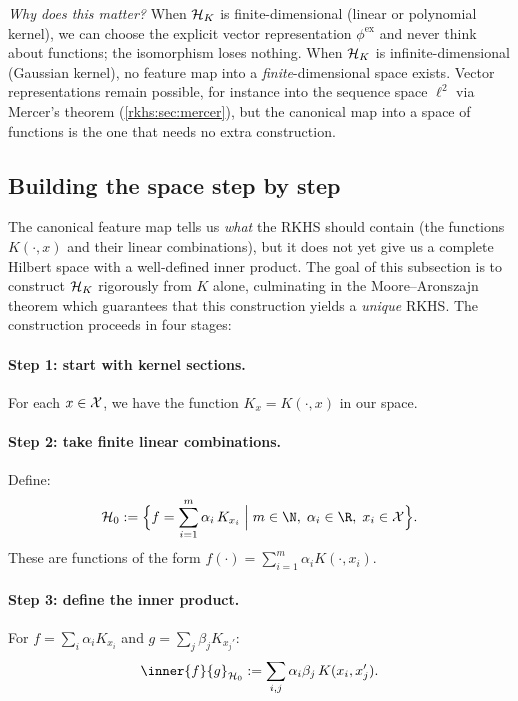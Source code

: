 \begin{notechapter}
\begin{intuition}
\emph{Why does this matter?} When $\mathcal{H}_K$ is
finite-dimensional (linear or polynomial kernel), we
can choose the explicit vector representation
$\phi^{\mathrm{ex}}$ and never think about functions;
the isomorphism loses nothing. When $\mathcal{H}_K$ is
infinite-dimensional (Gaussian kernel), no feature map into a \emph{finite}-dimensional space exists. Vector representations remain possible, for instance into the sequence space $\ell^2$ via Mercer's theorem (\cref{rkhs:sec:mercer}), but the canonical map into a space of functions is the one that needs no extra construction.
\end{intuition}

\subsection{Building the space step by step}
\label{rkhs:subsec:building_space}

The canonical feature map tells us \emph{what} the
RKHS should contain (the functions $K(\cdot, x)$ and
their linear combinations), but it does not yet give
us a complete Hilbert space with a well-defined inner
product. The goal of this subsection is to construct
$\mathcal{H}_K$ rigorously from $K$ alone, culminating in the
Moore--Aronszajn theorem which guarantees that this
construction yields a \emph{unique} RKHS. The
construction proceeds in four stages:

\paragraph{Step 1: start with kernel sections.} For each $x \in \mathcal{X}$, we
have the function $K_x = K(\cdot, x)$ in our space.

\paragraph{Step 2: take finite linear combinations.} Define:
\[
\hilb_0 := \Bigl\{ f = \sum_{i=1}^m \alpha_i\, K_{x_i} \;\Big|\; m \in
\N,\; \alpha_i \in \R,\; x_i \in \X \Bigr\}.
\]
These are functions of the form $f(\cdot) = \sum_{i=1}^m \alpha_i
K(\cdot, x_i)$.

\paragraph{Step 3: define the inner product.} For $f = \sum_i \alpha_i
K_{x_i}$ and $g = \sum_j \beta_j K_{x_j'}$:
\begin{equation}
\label{rkhs:eq:inner_product_h0}
\inner{f}{g}_{\hilb_0} := \sum_{i,j} \alpha_i \beta_j\, K(x_i, x_j').
\end{equation}


\end{notechapter}
